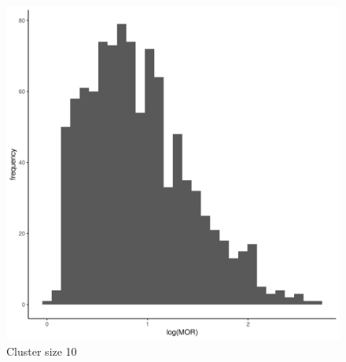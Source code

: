 \documentclass[
  letterpaper,
  DIV=11,
  numbers=noendperiod,
  titlepage]{scrartcl}
\begin{document}
\begin{figure}
\begin{minipage}[t]{0.24\linewidth}
{{\includegraphics{../../plots/two-lvl-ran-slope/low-prev/hist_30_10_two_lvl_slp_low_prev_q3.png}

}

\caption{Cluster size 10}

}

\end{minipage}%
%
\begin{minipage}[t]{0.24\linewidth}

{\centering 

}
\end{minipage}
\end{figure}
\end{document}
